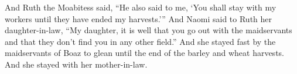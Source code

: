 \begin{enumerate}[align=center]
     And Ruth the Moabitess said, ``He also said to me, `You shall stay with my workers until they have ended my harvests.'''%
     And Naomi said to Ruth her daughter-in-law, ``My daughter, it is well that you go out with the maidservants and that they don't find you in any other field.''%
     And she stayed fast by the maidservants of Boaz to glean until the end of the barley and wheat harvests. And she stayed with her mother-in-law.%
\end{enumerate}
